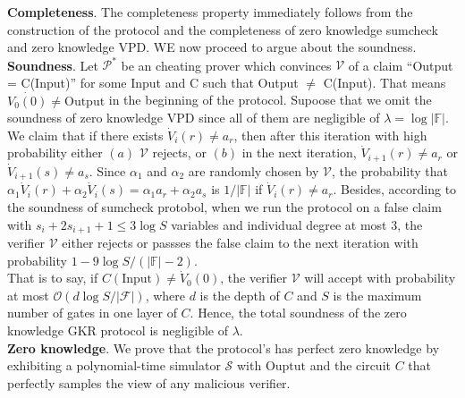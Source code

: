 \noindent
\textbf{Completeness}. The completeness property immediately follows from the construction of the protocol and the completeness of zero knowledge sumcheck and zero knowledge VPD. WE now proceed to argue about the soundness.\\

\noindent
\textbf{Soundness}. Let $\mathcal{P}^*$ be an cheating prover which convinces $\mathcal{V}$ of a claim ``Output = C(Input)'' for some Input and C such that Output $\neq$ C(Input). That means $\dot{V_0(0)} \neq \text{Output}$ in the beginning of the protocol. Supoose that we omit the soundness of zero knowledge VPD since all of them are negligible of $\lambda = \log |\mathbb{F}|$. We claim that if there exists $\dot{V}_i(r) \neq a_r$, then after this iteration with high probability either $(a)$ $\mathcal{V}$ rejects, or $(b)$ in the next iteration, $\dot{V}_{i+1}(r) \neq a_r$ or $\dot{V}_{i+1}(s) \neq a_s$. Since $\alpha_1$ and $\alpha_2$ are randomly chosen by $\mathcal{V}$, the probability that $\alpha_1 \dot{V}_i(r) + \alpha_2 \dot{V}_i(s) = \alpha_1 a_{r} + \alpha_2 a_{s}$ is $1/|\mathbb{F}|$ if $\dot{V}_i(r) \neq a_r$. Besides, according to the soundness of sumcheck protobol, when we run the protocol on a false claim with $s_{i} + 2s_{i+1} + 1 \leq 3 \log S$ variables and individual degree at most 3, the verifier $\mathcal{V}$ either rejects or passses the false claim to the next iteration with probability $1 - 9 \log S / (|\mathbb{F}| - 2)$.\\

That is to say, if $C(\text{Input}) \neq \dot{V}_0(0)$, the verifier $\mathcal{V}$ will accept with probability at most $\mathcal{O}(d \log S / |\mathcal{F}|)$, where $d$ is the depth of $C$ and $S$ is the maximum number of gates in one layer of $C$. Hence, the total soundness of the zero knowledge GKR protocol is negligible of $\lambda$.\\

\noindent
\textbf{Zero knowledge}. We prove that the protocol's has perfect zero knowledge by exhibiting a polynomial-time simulator $\mathcal{S}$ with $\text{Ouptut}$ and the circuit $C$ that perfectly samples the view of any malicious verifier. 

